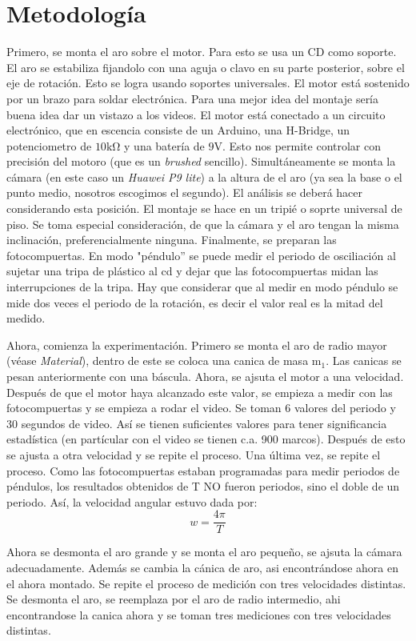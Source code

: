 \documentclass[12p]{article}
\begin{document}
\section{Metodología}
\noindent Primero, se monta el aro sobre el motor. Para esto se usa un CD como soporte. El aro se estabiliza fijandolo con una aguja o clavo en su parte posterior, sobre el eje de rotación. Esto se logra usando soportes universales. El motor está sostenido por un brazo para soldar electrónica. Para una mejor idea del montaje sería buena idea dar un vistazo a los videos. El motor está conectado a un circuito electrónico, que en escencia consiste de un Arduino, una H-Bridge, un potenciometro de $10 \mathrm{k\Omega}$ y una batería de $9 \mathrm{V}$. Esto nos permite controlar con precisión del motoro (que es un \emph{brushed} sencillo). Simultáneamente se monta la cámara (en este caso un \emph{Huawei P9 lite}) a la altura de el aro (ya sea la base o el punto medio, nosotros escogimos el segundo). El análisis se deberá hacer considerando esta posición. El montaje se hace en un tripié o soprte universal de piso. Se toma especial consideración, de que la cámara y el aro tengan la misma inclinación, preferencialmente ninguna. Finalmente, se preparan las fotocompuertas. En modo "péndulo'' se puede medir el periodo de osciliación al sujetar una tripa de plástico al cd y dejar que las fotocompuertas midan las interrupciones de la tripa. Hay que considerar que al medir en modo péndulo se mide dos veces el periodo de la rotación, es decir el valor real es la mitad del medido.
\par Ahora, comienza la experimentación. Primero se monta el aro de radio mayor (véase \emph{Material}), dentro de este se coloca una canica de masa $\mathrm{m_1}$. Las canicas se pesan anteriormente con una báscula. Ahora, se ajsuta el motor a una velocidad. Después de que el motor haya alcanzado este valor, se empieza a medir con las fotocompuertas y se empieza a rodar el video. Se toman 6 valores del periodo y 30 segundos de video. Así se tienen suficientes valores para tener significancia estadística (en partícular con el video se tienen c.a. 900 marcos). Después de esto se ajusta a otra velocidad y se repite el proceso. Una última vez, se repite el proceso.
Como las fotocompuertas estaban programadas para medir periodos de péndulos, los resultados obtenidos de T NO fueron periodos, sino el doble de un periodo. Así, la velocidad angular estuvo dada por:
$$w=\frac{4\pi}{T}$$
\par Ahora se desmonta el aro grande y se monta el aro pequeño, se ajsuta la cámara adecuadamente. Además se cambia la cánica de aro, asi encontrándose ahora en el ahora montado. Se repite el proceso de medición con tres velocidades distintas. Se desmonta el aro, se reemplaza por el aro de radio intermedio, ahi encontrandose la canica ahora y se toman tres mediciones con tres velocidades distintas.
\end{document}
